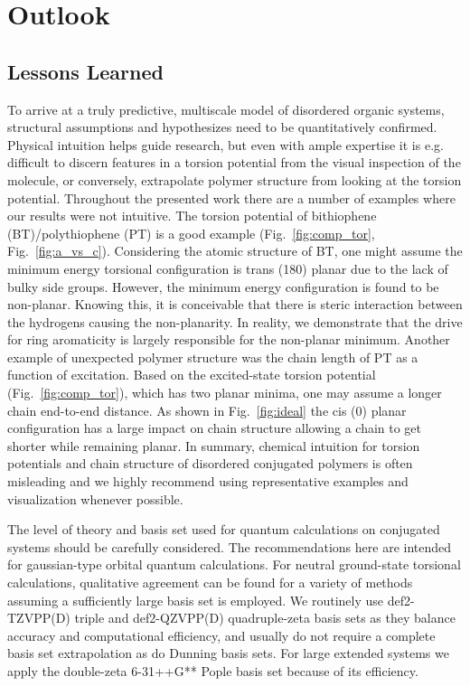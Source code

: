 \chapter{Outlook}

\section{Lessons Learned}

To arrive at a truly predictive, multiscale model of disordered organic systems, structural assumptions and hypothesizes need to be quantitatively confirmed. Physical intuition helps guide research, but even with ample expertise it is e.g. difficult to discern features in a torsion potential from the visual inspection of the molecule, or conversely, extrapolate polymer structure from looking at the torsion potential. Throughout the presented work there are a number of examples where our results were not intuitive. The torsion potential of bithiophene (BT)/polythiophene (PT) is a good example (Fig.~\ref{fig:comp_tor}, Fig.~\ref{fig:a_vs_c}). Considering the atomic structure of BT, one might assume the minimum energy torsional configuration is trans (180\textdegree) planar due to the lack of bulky side groups. However, the minimum energy configuration is found to be non-planar. Knowing this, it is conceivable that there is steric interaction between the hydrogens causing the non-planarity. In reality, we demonstrate that the drive for ring aromaticity is largely responsible for the non-planar minimum. Another example of unexpected polymer structure was the chain length of PT as a function of excitation. Based on the excited-state torsion potential (Fig.~\ref{fig:comp_tor}), which has two planar minima, one may assume a longer chain end-to-end distance. As shown in Fig.~\ref{fig:ideal} the cis (0\textdegree) planar configuration has a large impact on chain structure allowing a chain to get shorter while remaining planar. In summary, chemical intuition for torsion potentials and chain structure of disordered conjugated polymers is often misleading and we highly recommend using representative examples and visualization whenever possible.

The level of theory and basis set used for quantum calculations on conjugated systems should be carefully considered. The recommendations here are intended for gaussian-type orbital quantum calculations. For neutral ground-state torsional calculations, qualitative agreement can be found for a variety of methods assuming a sufficiently large basis set is employed. We routinely use def2-TZVPP(D) triple and def2-QZVPP(D) quadruple-zeta basis sets as they balance accuracy and computational efficiency, and usually do not require a complete basis set extrapolation as do Dunning basis sets. For large extended systems we apply the double-zeta 6-31++G** Pople basis set because of its efficiency.

